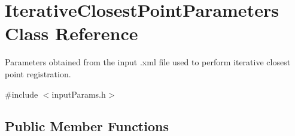 \hypertarget{classIterativeClosestPointParameters}{\section{Iterative\-Closest\-Point\-Parameters Class Reference}
\label{classIterativeClosestPointParameters}
}


Parameters obtained from the input .xml file used to perform iterative closest point registration.  




{\ttfamily \#include $<$input\-Params.\-h$>$}

\subsection*{Public Member Functions}
